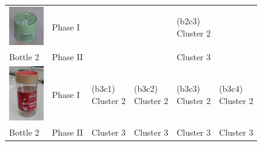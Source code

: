 \begin{table}
\begin{tabular}{p{1.6cm} p{1.6cm}|p{2cm} p{2cm} p{2cm}  p{2cm} }
{\parbox[c]{1em}{\includegraphics[width=1.5cm]{./fig_cha4/b2.jpg}}}
         & Phase I  &           &           &{\vspace{-0.7cm}}\pbox{2cm}{(b2c3) \\Cluster 2} &           \\
Bottle 2 & Phase II &           &           &       Cluster 3 &           \\ \hline

{\parbox[c]{1em}{\includegraphics[width=1.5cm]{./fig_cha4/b3.jpg}} }
         & Phase I  &{\vspace{-0.7cm}}\pbox{2cm}{(b3c1) \\Cluster 2} &{\vspace{-0.7cm}}\pbox{2cm}{(b3c2) \\Cluster 2} &{\vspace{-0.7cm}}\pbox{2cm}{(b3c3) \\Cluster 2} &{\vspace{-0.7cm}}\pbox{2cm}{(b3c4) \\Cluster 2} \\
Bottle 2 & Phase II &       Cluster 3 &       Cluster 3 &       Cluster 3 &       Cluster 3 \\ \hline


\end{tabular}
\end{table}
